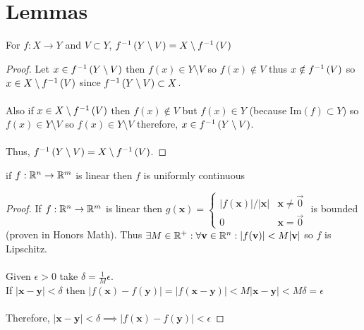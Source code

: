 \documentclass[12pt]{extarticle}
\begin{document}
\section*{Lemmas}

\begin{lemma} \label{complimentlem}
For $f : X \rightarrow Y$ and $V \subset Y$, $f^{-1} \left( Y \setminus V \right) = X \setminus f^{-1} \left( V \right)$
\end{lemma}

\begin{proof}
Let $x \in f^{-1} \left( Y \setminus V \right)$ then $f(x) \in Y \setminus V$  so $f(x) \notin V$ thus $x \notin f^{-1} \left( V \right)$ so $x \in X \setminus f^{-1} \left( V \right)$ since $f^{-1} \left( Y \setminus V \right) \subset X$. \\ \\
Also if $x \in X \setminus f^{-1} \left( V \right)$ then $f(x) \notin V$ but $f(x) \in Y$ (because $\text{Im}(f) \subset Y$) so $f(x) \in Y \setminus V$ so $f(x) \in Y \setminus V$ therefore, $x \in f^{-1} \left( Y \setminus V \right)$. \\ \\
Thus, $f^{-1} \left( Y \setminus V \right) = X \setminus f^{-1} \left( V \right)$.
\end{proof}

\begin{lemma} \label{linearlem}
if $f : \mathbb{R}^n \rightarrow \mathbb{R}^m$ is linear then $f$ is uniformly continuous
\end{lemma}

\begin{proof}
If $f : \mathbb{R}^n \rightarrow \mathbb{R}^m$ is linear then $g(\mathbf{x}) = \begin{cases} |f(\mathbf{x})|/|\mathbf{x}| & \mathbf{x} \neq \vec{0} \\
0 & \mathbf{x} = \vec{0} \end{cases}$ \quad is bounded \\ (proven in Honors Math). Thus $\exists M \in \mathbb{R}^+ : \forall \mathbf{v} \in \mathbb{R}^n : |f(\mathbf{v})| < M |\mathbf{v}|$ so $f$ is Lipschitz. \\ \\
Given $\epsilon > 0$ take $\delta = \frac{1}{M} \epsilon$.  \\
If $|\mathbf{x} - \mathbf{y}| < \delta$ then $|f(\mathbf{x}) - f(\mathbf{y})| = |f(\mathbf{x} - \mathbf{y})| < M |\mathbf{x} - \mathbf{y}| < M \delta = \epsilon$ \\ \\
Therefore, $|\mathbf{x} - \mathbf{y}| < \delta \implies |f(\mathbf{x}) - f(\mathbf{y})| < \epsilon$
\end{proof}
\end{document}
